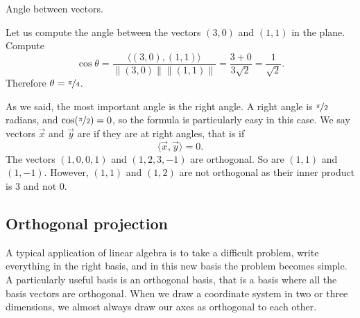 \documentclass{ximera}
\begin{document}
\begin{myfig}
    \capstart
    
    \caption{Angle between vectors.\label{vec-angle:fig}}
\end{myfig}

\begin{example}
    Let us compute the angle between the vectors $(3,0)$ and $(1,1)$ in the plane. Compute
    \begin{equation*}
        \cos \theta = \frac{\bigl\langle (3,0) , (1,1) \bigr\rangle}{\lVert(3,0)\rVert \lVert(1,1)\rVert} = \frac{3 + 0}{3 \sqrt{2}} = \frac{1}{\sqrt{2}} .
    \end{equation*}
    Therefore $\theta = \nicefrac{\pi}{4}$.
\end{example}

%

As we said, the most important angle is the right angle.  A right angle is $\nicefrac{\pi}{2}$ radians, and $\cos (\nicefrac{\pi}{2}) = 0$, so the formula is particularly easy in this case. We say vectors $\vec{x}$ and $\vec{y}$ are \emph{} if they are at right angles, that is if
\begin{equation*}
    \langle \vec{x} , \vec{y} \rangle = 0 .
\end{equation*}
The vectors $(1,0,0,1)$ and $(1,2,3,-1)$ are orthogonal.  So are $(1,1)$ and $(1,-1)$.  However, $(1,1)$ and $(1,2)$ are not orthogonal as their inner product is $3$ and not 0.

\subsection{Orthogonal projection}

A typical application of linear algebra is to take a difficult problem, write everything in the right basis, and in this new basis the problem becomes simple.  A particularly useful basis is an orthogonal basis, that is a basis where all the basis vectors are orthogonal.  When we draw a coordinate system in two or three dimensions, we almost always draw our axes as orthogonal to each other.
\end{document}
